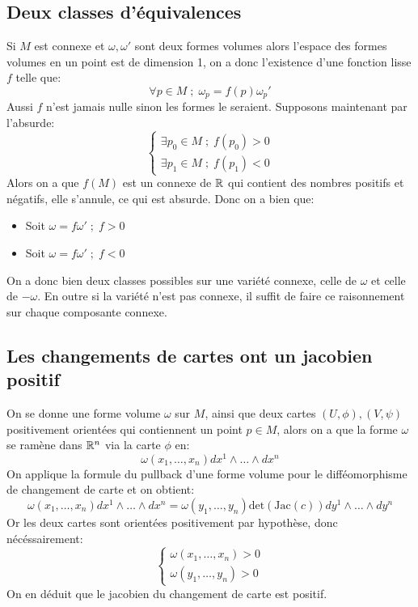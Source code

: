    \subsection{Deux classes d'équivalences}
      Si \( M \) est connexe et \( \omega, \omega' \) sont deux formes volumes alors l'espace des formes volumes en un point est de dimension 1, on a donc l'existence d'une fonction lisse \( f \) telle que:
      \[ 
         \forall p \in M \; ; \; \omega_p = f(p) \omega_p' 
      \]
      Aussi \( f \) n'est jamais nulle sinon les formes le seraient. Supposons maintenant par l'absurde:
      \[ 
         \begin{cases}
            \exists p_0 \in M \; ; \; f(p_0) > 0\\
            \exists p_1 \in M \; ; \; f(p_1) < 0
         \end{cases} 
      \]
      Alors on a que \(f(M)\) est un connexe de \( \mathbb{R} \) qui contient des nombres positifs et négatifs, elle s'annule, ce qui est absurde. Donc on a bien que:
      \begin{itemize}
         \item Soit \( \omega = f \omega' \; ; \; f > 0 \)
         \item Soit \( \omega = f\omega' \; ; \; f < 0 \) 
      \end{itemize}
      On a donc bien deux classes possibles sur une variété connexe, celle de \( \omega \) et celle de \( -\omega \). En outre si la variété n'est pas connexe, il suffit de faire ce raisonnement sur chaque composante connexe.
   \subsection{Les changements de cartes ont un jacobien positif}
      On se donne une forme volume \( \omega \) sur \( M \), ainsi que deux cartes \( (U, \phi), (V, \psi) \) positivement orientées qui contiennent un point \( p \in M\), alors on a que la forme \( \omega \) se ramène dans \( \mathbb{R}^n \) via la carte \( \phi \) en:
      \[ 
         \omega(x_1, \ldots, x_n) dx^1 \wedge \ldots \wedge dx^n
      \]
      On applique la formule du pullback d'une forme volume pour le difféomorphisme de changement de carte et on obtient:
      \[ 
         \omega(x_1, \ldots, x_n) dx^1 \wedge \ldots \wedge dx^n = \omega(y_1, \ldots, y_n) \text{det}(\text{Jac}(c)) dy^1 \wedge \ldots \wedge dy^n
      \]
      Or les deux cartes sont orientées positivement par hypothèse, donc nécéssairement:
      \[ 
         \begin{cases}
            \omega(x_1, \ldots, x_n) > 0\\
            \omega(y_1, \ldots, y_n) > 0
         \end{cases}
      \] 
      On en déduit que le jacobien du changement de carte est positif.
